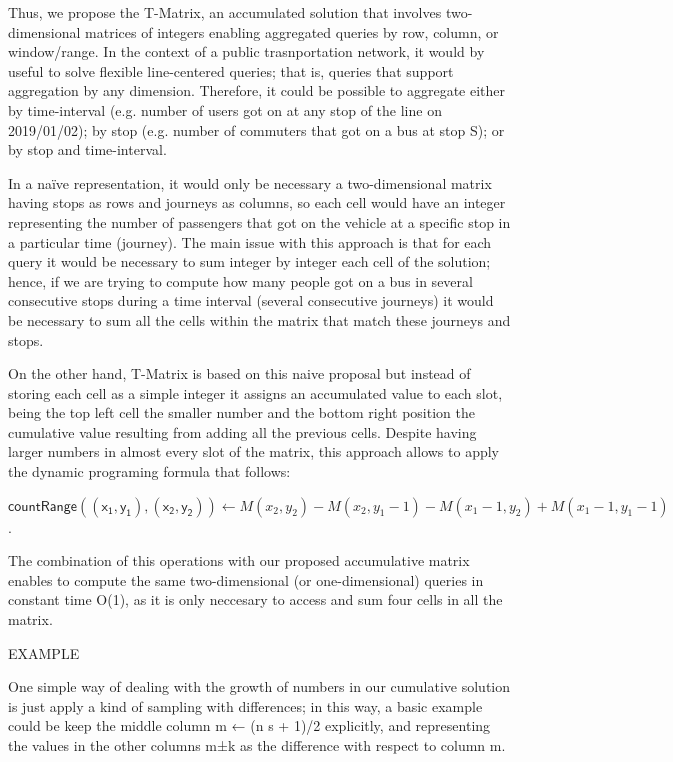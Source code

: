 \documentclass[runningheads]{llncs}
\begin{document}
Thus, we propose the T-Matrix, an accumulated solution that involves two-dimensional matrices of integers enabling aggregated queries by row, column, or window/range. In the context of a public trasnportation network, it would by useful to solve flexible line-centered queries; that is, queries that support aggregation by any dimension. Therefore, it could be possible to aggregate either by time-interval (e.g. number of users got on at any stop of the line on 2019/01/02); by stop (e.g. number of commuters that got on a bus at stop S); or by stop and time-interval.

In a naïve representation, it would only be necessary a two-dimensional matrix having stops as rows and journeys as columns, so each cell would have an integer representing the number of passengers that got on the vehicle at a specific stop in a particular time (journey). The main issue with this approach is that for each query it would be necessary to sum integer by integer each cell of the solution; hence, if we are trying to compute how many people got on a bus in several consecutive stops during a time interval (several consecutive journeys) it would be necessary to sum all the cells within the matrix that match these journeys and stops.

On the other hand, T-Matrix is based on this naive proposal but instead of storing each cell as a simple integer it assigns an accumulated value to each slot, being the top left cell the smaller number and the bottom right position the cumulative value resulting from adding all the previous cells. Despite having larger numbers in almost every slot of the matrix, this approach allows to apply the dynamic programing formula that follows:

$\mathsf{countRange((x_1,y_1),(x_2,y_2))} \leftarrow {M(x_2,y_2)} - {M(x_2,y_1-1)} - {M(x_1-1,y_2)} + {M(x_1-1,y_1-1)}$.

The combination of this operations with our proposed accumulative matrix enables to compute the same two-dimensional (or one-dimensional) queries in constant time O(1), as it is only neccesary to access and sum four cells in all the matrix.

EXAMPLE

One simple way of dealing with the growth of numbers in our cumulative solution is just apply a kind of sampling with differences; in this way, a basic example could be keep the middle column m ← (n s + 1)/2 explicitly, and representing the values in the other columns m±k as the difference with respect to column m.
\end{document}

